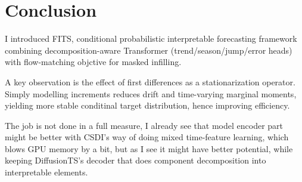 \chapter{Conclusion}

I introduced FITS, conditional probabilistic interpretable forecasting framework combining decomposition-aware Transformer (trend/season/jump/error heads) with flow-matching objctive for masked infilling.

A key observation is the effect of first differences as a stationarization operator. Simply modelling increments reduces drift and time-varying marginal moments, yielding more stable conditinal target distribution, hence improving efficiency.

The job is not done in a full measure, I already see that model encoder part might be better with CSDI's way of doing mixed time-feature learning, which blows GPU memory by a bit, but as I see it might have better potential, while keeping DiffusionTS's decoder that does component decomposition into interpretable elements.
